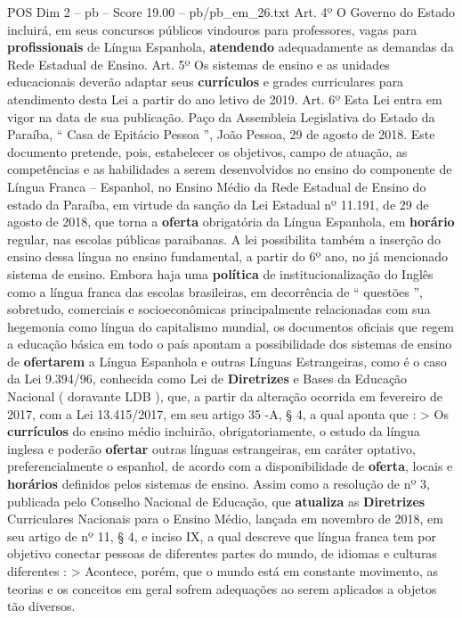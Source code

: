 \begin{textsample}{POS Dim 2 – pb – Score 19.00 – pb/pb\_em\_26.txt}
Art. 4º O Governo do Estado incluirá, em seus concursos públicos vindouros para professores, vagas para \textbf{profissionais} de Língua Espanhola, \textbf{atendendo} adequadamente as demandas da Rede Estadual de Ensino.
Art. 5º Os sistemas de ensino e as unidades educacionais deverão adaptar seus \textbf{currículos} e grades curriculares para atendimento desta Lei a partir do ano letivo de 2019.
Art. 6º Esta Lei entra em vigor na data de sua publicação.
Paço da Assembleia Legislativa do Estado da Paraíba, “ Casa de Epitácio Pessoa ”, João Pessoa, 29 de agosto de 2018.
Este documento pretende, pois, estabelecer os objetivos, campo de atuação, as competências e as habilidades a serem desenvolvidos no ensino do componente de Língua Franca – Espanhol, no Ensino Médio da Rede Estadual de Ensino do estado da Paraíba, em virtude da sanção da Lei Estadual nº 11.191, de 29 de agosto de 2018, que torna a \textbf{oferta} obrigatória da Língua Espanhola, em \textbf{horário} regular, nas escolas públicas paraibanas.
A lei possibilita também a inserção do ensino dessa língua no ensino fundamental, a partir do 6º ano, no já mencionado sistema de ensino.
Embora haja uma \textbf{política} de institucionalização do Inglês como a língua franca das escolas brasileiras, em decorrência de “ questões ”, sobretudo, comerciais e socioeconômicas principalmente relacionadas com sua hegemonia como língua do capitalismo mundial, os documentos oficiais que regem a educação básica em todo o país apontam a possibilidade dos sistemas de ensino de \textbf{ofertarem} a Língua Espanhola e outras Línguas Estrangeiras, como é o caso da Lei 9.394/96, conhecida como Lei de \textbf{Diretrizes} e Bases da Educação Nacional ( doravante LDB ), que, a partir da alteração ocorrida em fevereiro de 2017, com a Lei 13.415/2017, em seu artigo 35 -A, § 4, a qual aponta que : > Os \textbf{currículos} do ensino médio incluirão, obrigatoriamente, o estudo da língua inglesa e poderão \textbf{ofertar} outras línguas estrangeiras, em caráter optativo, preferencialmente o espanhol, de acordo com a disponibilidade de \textbf{oferta}, locais e \textbf{horários} definidos pelos sistemas de ensino.
Assim como a resolução de nº 3, publicada pelo Conselho Nacional de Educação, que \textbf{atualiza} as \textbf{Diretrizes} Curriculares Nacionais para o Ensino Médio, lançada em novembro de 2018, em seu artigo de nº 11, § 4, e inciso IX, a qual descreve que língua franca tem por objetivo conectar pessoas de diferentes partes do mundo, de idiomas e culturas diferentes : > Acontece, porém, que o mundo está em constante movimento, as teorias e os conceitos em geral sofrem adequações ao serem aplicados a objetos tão diversos.

\end{textsample}

